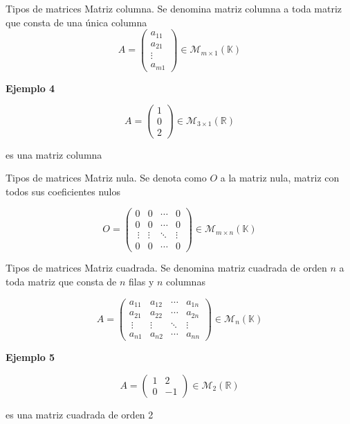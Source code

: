 \documentclass[
  ignorenonframetext,
]{beamer}
\begin{document}
\begin{frame}{Tipos de matrices}
\protect\hypertarget{tipos-de-matrices-2}{}
Matriz columna. Se denomina matriz columna a toda matriz que consta de
una única columna
\[A = \begin{pmatrix}a_{11} \\ a_{21}\\ \vdots \\ a_{m1}\end{pmatrix}\in\mathcal{M}_{m\times 1}(\mathbb{K})\]

\textbf{Ejemplo 4}

\[A =\begin{pmatrix}1\\0\\2\end{pmatrix}\in\mathcal{M}_{3\times 1}(\mathbb{R})\]

es una matriz columna
\end{frame}

\begin{frame}{Tipos de matrices}
\protect\hypertarget{tipos-de-matrices-3}{}
Matriz nula. Se denota como \(O\) a la matriz nula, matriz con todos sus
coeficientes nulos

\[O = \begin{pmatrix}0&0&\cdots&0\\0&0&\cdots&0\\\ \vdots & \vdots & \ddots& \vdots\\0&0&\cdots&0\end{pmatrix}\in\mathcal{M}_{m\times n}(\mathbb{K})\]
\end{frame}

\begin{frame}{Tipos de matrices}
\protect\hypertarget{tipos-de-matrices-4}{}
Matriz cuadrada. Se denomina matriz cuadrada de orden \(n\) a toda
matriz que consta de \(n\) filas y \(n\) columnas

\[A = \begin{pmatrix}a_{11}&a_{12}&\cdots&a_{1n}\\a_{21}&a_{22}&\cdots&a_{2n}\\\ \vdots & \vdots & \ddots& \vdots\\a_{n1}&a_{n2}&\cdots&a_{nn}\end{pmatrix}\in\mathcal{M}_n(\mathbb{K})\]

\textbf{Ejemplo 5}

\[A =\begin{pmatrix}1 & 2\\0&-1\end{pmatrix}\in\mathcal{M}_2(\mathbb{R})\]

es una matriz cuadrada de orden 2
\end{frame}
\end{document}
